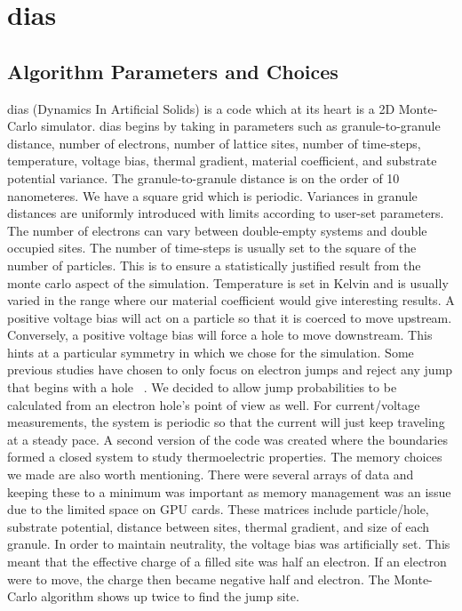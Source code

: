 \section{{\sc dias}}

\subsection{Algorithm Parameters and Choices}
{\sc dias} (Dynamics In Artificial Solids) is a code which at its heart is a 2D Monte-Carlo simulator. {\sc dias} begins by taking in parameters such as granule-to-granule distance, number of electrons, number of lattice sites, number of time-steps, temperature, voltage bias, thermal gradient, material coefficient, and substrate potential variance. The granule-to-granule distance is on the order of 10 nanometeres. We have a square grid which is periodic. Variances in granule distances are uniformly introduced with limits according to user-set parameters. The number of electrons can vary between double-empty systems and double occupied sites. The number of time-steps is usually set to the square of the number of particles. This is to ensure a statistically justified result from the monte carlo aspect of the simulation. Temperature is set in Kelvin and is usually varied in the range where our material coefficient would give interesting results.  A positive voltage bias will act on a particle so that it is coerced to move upstream. Conversely, a positive voltage bias will force a hole to move downstream. This hints at a particular symmetry in which we chose for the simulation. Some previous studies have chosen to only focus on electron jumps and reject any jump that begins with a hole ~\cite{Ferrero14}. We decided to allow jump probabilities to be calculated from an electron hole's point of view as well. For current/voltage measurements, the system is periodic so that the current will just keep traveling at a steady pace. A second version of the code was created where the boundaries formed a closed system to study thermoelectric properties. The memory choices we made are also worth mentioning. There were several arrays of data and keeping these to a minimum was important as memory management was an issue due to the limited space on GPU cards. These matrices include particle/hole, substrate potential, distance between sites, thermal gradient, and size of each granule. In order to maintain neutrality, the voltage bias was artificially set. This meant that the effective charge of a filled site was half an electron. If an electron were to move, the charge then became negative half and electron. The Monte-Carlo algorithm shows up twice to find the jump site.  

